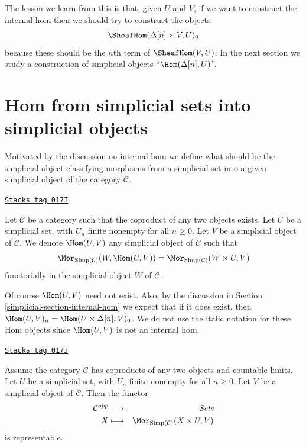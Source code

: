 \medskip\noindent
The lesson we learn from this is that, given $U$ and $V$,
if we want to construct the internal hom then we should try to
construct the objects
$$
\SheafHom(\Delta[n] \times V, U)_0
$$
because these should be the $n$th term of $\SheafHom(V, U)$.
In the next section we study a construction of simplicial objects
``$\Hom(\Delta[n], U)$''.

\section{Hom from simplicial sets into simplicial objects}
\label{simplicial-section-hom-from-simplicial-sets}
Motivated by the discussion on internal hom we define
what should be the simplicial object classifying
morphisms from a simplicial set into a given
simplicial object of the category $\mathcal{C}$.

\begin{definition}
\label{simplicial-definition-hom-from-simplicial-set}
\href{https://stacks.math.columbia.edu/tag/017I}{\texttt{Stacks tag 017I}}

Let $\mathcal{C}$ be a category such that the coproduct
of any two objects exists.
Let $U$ be a simplicial set, with $U_n$ finite nonempty
for all $n \geq 0$.
Let $V$ be a simplicial object of $\mathcal{C}$.
We denote {\it $\Hom(U, V)$} any simplicial object of
$\mathcal{C}$ such that
$$
\Mor_{\text{Simp}(\mathcal{C})}(W, \Hom(U, V))
=
\Mor_{\text{Simp}(\mathcal{C})}(W \times U, V)
$$
functorially in the simplicial object $W$ of $\mathcal{C}$.
\end{definition}

Of course $\Hom(U, V)$ need not exist.
Also, by the discussion in Section \ref{simplicial-section-internal-hom}
we expect that if it does exist, then
$\Hom(U, V)_n = \Hom(U \times \Delta[n], V)_0$.
We do not use the italic notation for these Hom objects
since $\Hom(U, V)$ is not an internal hom.

\begin{lemma}
\label{simplicial-lemma-exists-hom-0-from-simplicial-set}
\href{https://stacks.math.columbia.edu/tag/017J}{\texttt{Stacks tag 017J}}

Assume the category $\mathcal{C}$
has coproducts of any two objects and countable
limits. Let $U$ be a simplicial set, with $U_n$ finite nonempty
for all $n \geq 0$.
Let $V$ be a simplicial object of $\mathcal{C}$.
Then the functor
\begin{eqnarray*}
\mathcal{C}^{opp} & \longrightarrow & \textit{Sets} \\
X
& \longmapsto &
\Mor_{\text{Simp}(\mathcal{C})}(X \times U, V)
\end{eqnarray*}
is representable.
\end{lemma}


